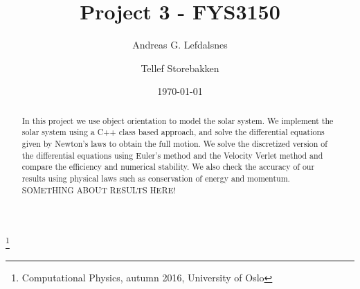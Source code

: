 \documentclass[%
 reprint,
 nobalance,
 amsmath,amssymb,
 aps,
]{revtex4-1}
\begin{document}

\title{Project 3 - FYS3150}%
\thanks{Computational Physics, autumn 2016, University of Oslo}%

\author{Andreas G. Lefdalsnes}

%

\author{Tellef Storebakken}




\date{\today}%

\begin{abstract}
In this project we use object orientation to model the solar system. We implement the solar system using a C++ class based approach, and solve the differential equations given by Newton's laws to obtain the full motion. We solve the discretized version of the differential equations using Euler's method and the Velocity Verlet method and compare the efficiency and numerical stability. We also check the accuracy of our results using physical laws such as conservation of energy and momentum. SOMETHING ABOUT RESULTS HERE!


\end{abstract}
\end{document}
